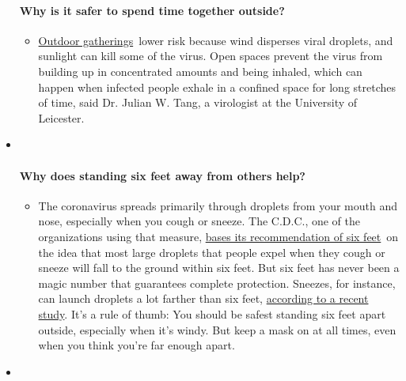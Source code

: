 \begin{itemize}
{  \paragraph{Why is it safer to spend time together
  outside?}\label{why-is-it-safer-to-spend-time-together-outside}}

  \begin{itemize}
  \tightlist
  \item
    \href{https://www.nytimes3xbfgragh.onion/2020/05/15/us/coronavirus-what-to-do-outside.html?action=click\&pgtype=Article\&state=default\&region=MAIN_CONTENT_3\&context=storylines_faq}{Outdoor
    gatherings}~lower risk because wind disperses viral droplets, and
    sunlight can kill some of the virus. Open spaces prevent the virus
    from building up in concentrated amounts and being inhaled, which
    can happen when infected people exhale in a confined space for long
    stretches of time, said Dr. Julian W. Tang, a virologist at the
    University of Leicester.
  \end{itemize}
\item ~
  \hypertarget{why-does-standing-six-feet-away-from-others-help}{%
  \paragraph{Why does standing six feet away from others
  help?}\label{why-does-standing-six-feet-away-from-others-help}}

  \begin{itemize}
  \tightlist
  \item
    The coronavirus spreads primarily through droplets from your mouth
    and nose, especially when you cough or sneeze. The C.D.C., one of
    the organizations using that measure,
    \href{https://www.nytimes3xbfgragh.onion/2020/04/14/health/coronavirus-six-feet.html?action=click\&pgtype=Article\&state=default\&region=MAIN_CONTENT_3\&context=storylines_faq}{bases
    its recommendation of six feet}~on the idea that most large droplets
    that people expel when they cough or sneeze will fall to the ground
    within six feet. But six feet has never been a magic number that
    guarantees complete protection. Sneezes, for instance, can launch
    droplets a lot farther than six feet,
    \href{https://jamanetwork.com/journals/jama/fullarticle/2763852}{according
    to a recent study}. It's a rule of thumb: You should be safest
    standing six feet apart outside, especially when it's windy. But
    keep a mask on at all times, even when you think you're far enough
    apart.
  \end{itemize}
\item ~
  \hypertarget{i-have-antibodies-am-i-now-immune}{%
}
\end{itemize}
